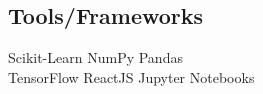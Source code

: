 \documentclass[letterpaper]{deedy-resume} %
\begin{document}
\begin{minipage}[t]{0.33\textwidth}
\sectionspace %

\subsection{Tools/Frameworks}

Scikit-Learn \textbullet{} NumPy \textbullet{} Pandas \\
TensorFlow \textbullet{} ReactJS \textbullet{} Jupyter Notebooks
 
\sectionspace %






\end{minipage} %
\hfill
%
%
\end{document}
